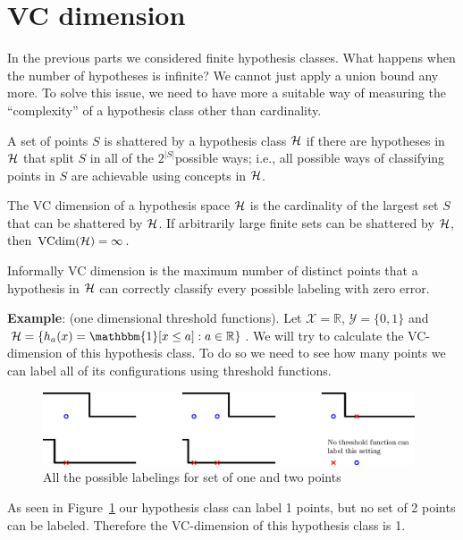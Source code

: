 \documentclass{article}
\begin{document}
\section{VC dimension}
In the previous parts we considered finite hypothesis classes. What happens when the number of hypotheses is infinite? We cannot just apply a union bound any more. To solve this issue, we need to have more a suitable way of measuring the “complexity” of a hypothesis class other than cardinality.
\begin{defn}[Shattering]
A set of points $S$ is shattered by a hypothesis class $\HH$ if there are hypotheses in $\HH$ that split $S$ in all of the $2^{|S|}$possible ways; i.e., all possible ways of classifying points in $S$ are achievable using concepts in $\HH$. 
\end{defn}
\begin{defn}[VC dimension of $\HH$]
The VC dimension of a hypothesis space $\HH$ is the cardinality of the largest set $S$ that can be shattered by $\HH$. If arbitrarily large finite sets can be shattered by $\HH$, then $\mathrm{VCdim}(\mathcal{H}) = \infty$.
\end{defn}
Informally VC dimension is the maximum number of distinct points that a hypothesis in $\HH$ can correctly classify every possible labeling with zero error.

\textbf{Example}: (one dimensional threshold functions). Let $\mathcal{X} =  \mathbb{R}$, $\mathcal{Y} = \{0,1\}$ and $\HH = \{h_a(x) = \mathbbm{1}[x \leq a]: a \in \mathbb{R}\}$. We will try to calculate the VC-dimension of this hypothesis class. To do so we need to see how many points we can label all of its configurations using threshold functions.

\begin{figure}[ht]
\centering 
\includegraphics[width=0.98\textwidth]{vcdim.eps}
\caption{All the possible labelings for set of one and two points}
\label{fig:vcdim}
\end{figure}

As seen in Figure~\ref{fig:vcdim} our hypothesis class can label 1 points, but no set of 2 points can be labeled. Therefore the VC-dimension of this hypothesis class is 1.




\end{document}
